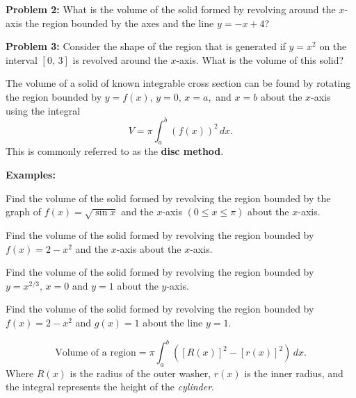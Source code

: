 \documentclass[addpoints, 12pt]{exam}
\begin{document}
\textbf{Problem 2:} What is the volume of the solid formed by revolving around the $x$-axis the region bounded by the axes and the line $y=-x+4$?

\textbf{Problem 3:} Consider the shape of the region that is generated if $y=x^2$ on the interval $[0,\,3]$ is revolved around the $x$-axis. What is the volume of this solid?

\newpage


\begin{tcolorbox}[title= VOLUME OF A SOLID OF REVOLUTION,colframe=black,sharp corners,colback=white,colbacktitle=white,coltitle=black,boxrule=1pt]

     The volume of a solid of known integrable cross section can be found by rotating the region bounded by $y=f(x),\,y=0,\,x=a,$ and $x=b$ about the $x$-axis using the integral
     \[V=\pi\int_a^b\left(f(x)\right)^2\,dx.\]
     This is commonly referred to as the \textbf{disc method}.
    
\end{tcolorbox}
\textbf{Examples:}
\begin{questions}
    \question Find the volume of the solid formed by revolving the region bounded by the graph of $f(x)=\sqrt{\sin x}$ and the $x$-axis $\left(0\le x\le\pi\right)$ about the $x$-axis.
    
    \question Find the volume of the solid formed by revolving the region bounded by $f(x)=2-x^2$ and the $x$-axis about the $x$-axis.
    
    \question Find the volume of the solid formed by revolving the region bounded by $y=x^{2/3},\, x=0$ and $y=1$ about the $y$-axis.
    
    \newpage
    
    \question Find the volume of the solid formed by revolving the region bounded by $f(x)=2-x^2$ and $g(x)=1$ about the line $y=1$.

\end{questions}

\begin{tcolorbox}[title= VOLUME OF A REGION USING WASHERS,colframe=black,sharp corners,colback=white,colbacktitle=white,coltitle=black,boxrule=1pt]

     \[\text{Volume of a region}=\pi\int_a^b\left(\left[R(x)\right]^2-\left[r(x)\right]^2\right)\,dx.\]
     Where $R(x)$ is the radius of the outer washer, $r(x)$ is the inner radius, and the integral represents the height of the \textit{cylinder}.
    
\end{tcolorbox}
\end{document}
